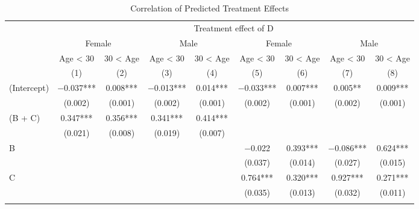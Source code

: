 \documentclass[
]{article}
\begin{document}
\begin{table}

\caption{\label{tab:rcf-int-corr}Correlation of Predicted Treatment Effects}
\centering
\fontsize{9}{11}\selectfont
\begin{threeparttable}
\begin{tabular}[t]{lcccccccc}
\toprule
\multicolumn{1}{c}{ } & \multicolumn{8}{c}{Treatment effect of D} \\
\cmidrule(l{3pt}r{3pt}){2-9}
\multicolumn{1}{c}{ } & \multicolumn{2}{c}{Female} & \multicolumn{2}{c}{Male} & \multicolumn{2}{c}{Female} & \multicolumn{2}{c}{Male} \\
\cmidrule(l{3pt}r{3pt}){2-3} \cmidrule(l{3pt}r{3pt}){4-5} \cmidrule(l{3pt}r{3pt}){6-7} \cmidrule(l{3pt}r{3pt}){8-9}
\multicolumn{1}{c}{ } & \multicolumn{1}{c}{Age < 30} & \multicolumn{1}{c}{30 < Age} & \multicolumn{1}{c}{Age < 30} & \multicolumn{1}{c}{30 < Age} & \multicolumn{1}{c}{Age < 30} & \multicolumn{1}{c}{30 < Age} & \multicolumn{1}{c}{Age < 30} & \multicolumn{1}{c}{30 < Age} \\
\cmidrule(l{3pt}r{3pt}){2-2} \cmidrule(l{3pt}r{3pt}){3-3} \cmidrule(l{3pt}r{3pt}){4-4} \cmidrule(l{3pt}r{3pt}){5-5} \cmidrule(l{3pt}r{3pt}){6-6} \cmidrule(l{3pt}r{3pt}){7-7} \cmidrule(l{3pt}r{3pt}){8-8} \cmidrule(l{3pt}r{3pt}){9-9}
  & (1) & (2) & (3) & (4) & (5) & (6) & (7) & (8)\\
\midrule
(Intercept) & \num{-0.037}*** & \num{0.008}*** & \num{-0.013}*** & \num{0.014}*** & \num{-0.033}*** & \num{0.007}*** & \num{0.005}** & \num{0.009}***\\
 & (\num{0.002}) & (\num{0.001}) & (\num{0.002}) & (\num{0.001}) & (\num{0.002}) & (\num{0.001}) & (\num{0.002}) & (\num{0.001})\\
(B + C) & \num{0.347}*** & \num{0.356}*** & \num{0.341}*** & \num{0.414}*** &  &  &  & \\
 & (\num{0.021}) & (\num{0.008}) & (\num{0.019}) & (\num{0.007}) &  &  &  \vphantom{1} & \\
B &  &  &  &  & \num{-0.022} & \num{0.393}*** & \num{-0.086}*** & \num{0.624}***\\
 &  &  &  &  & (\num{0.037}) & (\num{0.014}) & (\num{0.027}) & (\num{0.015})\\
C &  &  &  &  & \num{0.764}*** & \num{0.320}*** & \num{0.927}*** & \num{0.271}***\\
 &  &  &  &  & (\num{0.035}) & (\num{0.013}) & (\num{0.032}) & (\num{0.011})\\
\addlinespace[0.3em]
\multicolumn{9}{l}{\textit{Linear combination test (F-test)}}\\

\end{tabular}
\end{threeparttable}
\end{table}
\end{document}
